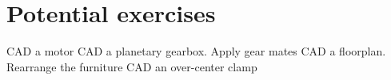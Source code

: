 \section{Potential exercises}

CAD a motor
CAD a planetary gearbox. Apply gear mates
CAD a floorplan. Rearrange the furniture
CAD an over-center clamp
